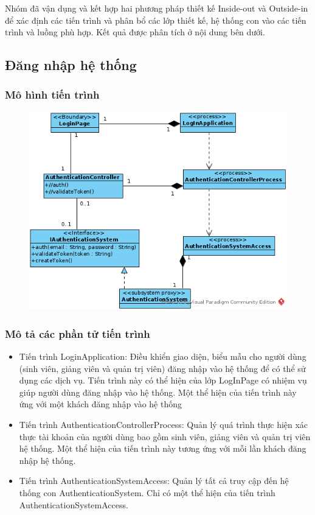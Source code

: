 \documentclass[./../main.tex]{subfiles}
\begin{document}
Nhóm đã vận dụng và kết hợp hai phương pháp thiết kế Inside-out và Outside-in để xác định các tiến trình và phân bổ các lớp thiết kế, hệ thống con vào các tiến trình và luồng phù hợp. Kết quả được phân tích ở nội dung bên dưới.

\subsection{Đăng nhập hệ thống}

\subsubsection{Mô hình tiến trình}

\begin{figure}[H]
	\centering
	\includegraphics[width=\linewidth]{./images/pv_login.png}
\end{figure}

\subsubsection{Mô tả các phần tử tiến trình}
\begin{itemize}
	\item Tiến trình LoginApplication: Điều khiển giao diện, biểu mẫu cho người dùng (sinh viên, giảng viên và quản trị viên) đăng nhập vào hệ thống để có thể sử dụng các dịch vụ. Tiến trình này có thể hiện của lớp LogInPage có nhiệm vụ giúp người dùng đăng nhập vào hệ thống.
	      Một thể hiện của tiến trình này ứng với một khách đăng nhập vào hệ thống
	\item Tiến trình AuthenticationControllerProcess: Quản lý quá trình thực hiện xác thực tài khoản của người dùng bao gồm sinh viên, giảng viên và quản trị viên hệ thống.
	      Một thể hiện của tiến trình này tương ứng với mỗi lần khách đăng nhập hệ thống.
	\item Tiến trình AuthenticationSystemAccess: Quản lý tất cả truy cập đến hệ thống con AuthenticationSystem.
	      Chỉ có một thể hiện của tiến trình AuthenticationSystemAccess.
\end{itemize}
\end{document}
